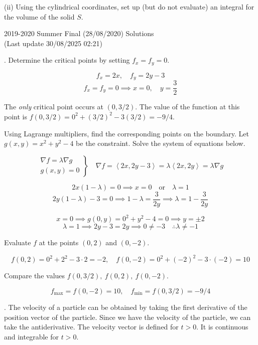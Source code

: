 \documentclass{article}
\begin{document}
\hfill

(ii) Using the cylindrical coordinates, set up (but do not evaluate) an integral for the volume of the solid $S$.

\newpage

\begin{center}
2019-2020 Summer Final (28/08/2020) Solutions\\
(Last update 30/08/2025 02:21)
\end{center}

. Determine the critical points by setting $f_x=f_y=0$.

\[f_x=2x,\quad f_y=2y-3\]
\[f_x=f_y=0\implies x=0,\quad y=\frac32\]

\noindent The \textit{only} critical point occurs at $(0,3/2)$. The value of the function at this point is $f(0, 3/2) = 0^2 + (3/2)^2 -3(3/2)=-9/4$.

\hfill

\noindent Using Lagrange multipliers, find the corresponding points on the boundary. Let $g(x,y)=x^2+y^2-4$ be the constraint. Solve the system of equations below.

\[
\left.
\begin{array}{ll}
\displaystyle\nabla f =\lambda \nabla g\\
\displaystyle g(x,y) = 0
\end{array}
\right\}\quad
\nabla f = \left\langle2x,2y-3\right\rangle=\lambda\left\langle2x,2y\right\rangle= \lambda\nabla g
\]

\[2x(1-\lambda)=0\implies x=0\quad\text{or}\quad\lambda=1\]
\[2y(1-\lambda)-3=0\implies1-\lambda=\frac3{2y}\implies\lambda=1-\frac3{2y}\]

\[x=0\implies g(0,y)=0^2+y^2-4=0\implies y=\pm2\]
\[\lambda=1\implies 2y-3=2y\implies 0\neq-3\quad\therefore\lambda\neq-1\]

\hfill

\noindent Evaluate $f$ at the points $(0,2)$ and $(0,-2)$.

\[f(0,2)=0^2+2^2-3\cdot2=-2,\quad f(0,-2)=0^2+(-2)^2-3\cdot(-2)=10\]

\hfill

\noindent Compare the values $f(0,3/2),\:f(0,2),\:f(0,-2)$.

\[\boxed{f_{\text{max}}=f(0,-2)=10,\quad f_{\text{min}}=f(0,3/2)=-9/4}\]

\hfill

. The velocity of a particle can be obtained by taking the first derivative of the position vector of the particle. Since we have the velocity of the particle, we can take the antiderivative. The velocity vector is defined for $t>0$. It is continuous and integrable for $t>0$.
\end{document}
